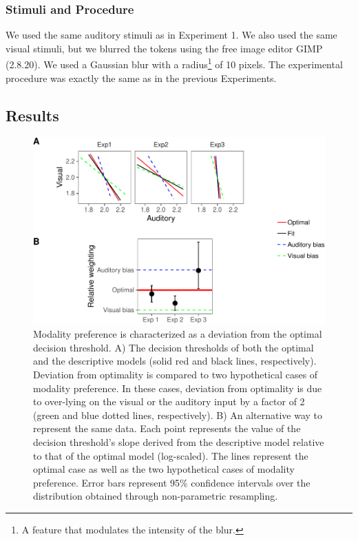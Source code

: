 \documentclass[english,,man,floatsintext]{apa6}
\let\rmarkdownfootnote\footnote%
\def\footnote{\protect\rmarkdownfootnote}
\theoremstyle{definition}
\theoremstyle{definition}
\theoremstyle{definition}
\theoremstyle{remark}
\begin{document}
\subsubsection{Stimuli and Procedure}\label{stimuli-and-procedure-1}

We used the same auditory stimuli as in Experiment 1. We also used the
same visual stimuli, but we blurred the tokens using the free image
editor GIMP (2.8.20). We used a Gaussian blur with a
radius\footnote{A feature that modulates the intensity of the blur.} of
10 pixels. The experimental procedure was exactly the same as in the
previous Experiments.

\subsection{Results}\label{results-1}

\begin{figure}[!h]
\includegraphics[width=\textwidth]{ms_r2_files/figure-latex/bias-1} \caption{Modality preference is characterized as a deviation from the optimal decision threshold. A) The decision thresholds of both the optimal and the descriptive models (solid red and black lines, respectively). Deviation from optimality is compared to two hypothetical cases of modality preference. In these cases, deviation from optimality is due to over-lying on the visual or the auditory input by a factor of 2 (green and blue dotted lines, respectively). B) An alternative way to represent the same data. Each point represents the value of the decision threshold's slope derived from the descriptive model relative to that of the optimal model (log-scaled). The lines represent the optimal case as well as the two hypothetical cases of modality preference. Error bars represent 95\% confidence intervals over the distribution obtained through non-parametric resampling.}\label{fig:bias}
\end{figure}
\end{document}
